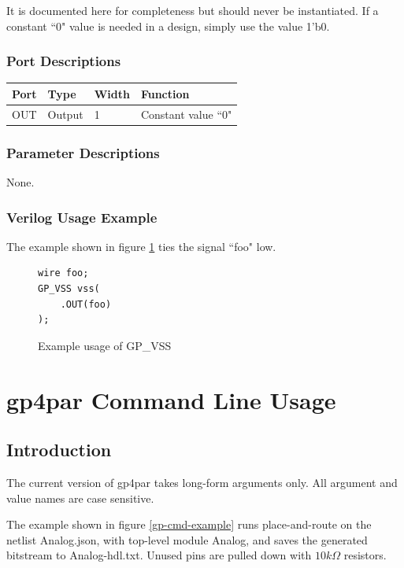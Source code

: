 \documentclass{article}
\begin{document}
It is documented here for completeness but should never be instantiated. If a constant ``0" value is needed in a 
design, simply use the value 1'b0.

\subsubsection{Port Descriptions}

\begin{tabularx}{4in}{|l|l|l|X|}
\hline
{\bfseries Port} & {\bfseries Type} & {\bfseries Width} & {\bfseries Function} \\
\hline
OUT & Output & 1 & Constant value ``0" \\
\hline
\end{tabularx}

\subsubsection{Parameter Descriptions}

None.

\subsubsection{Verilog Usage Example}

The example shown in figure \ref{gp-vss-example} ties the signal ``foo" low.

\begin{figure}[h]
\begin{lstlisting}
wire foo;
GP_VSS vss(
	.OUT(foo)
);
\end{lstlisting}
\caption{Example usage of GP\_VSS}
\label{gp-vss-example}
\end{figure}

\pagebreak
\section{gp4par Command Line Usage}

\subsection{Introduction}

The current version of gp4par takes long-form arguments only. All argument and value names are case sensitive.

The example shown in figure \ref{gp-cmd-example} runs place-and-route on the netlist Analog.json, with top-level module 
Analog, and saves the generated bitstream to Analog-hdl.txt. Unused pins are pulled down with $10 k\Omega$ resistors.
\end{document}
